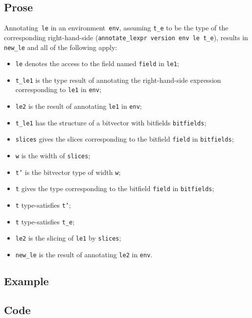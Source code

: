 \documentclass{book}
\begin{document}
    \subsection{Prose}
   Annotating~\texttt{le} in an environment~\texttt{env}, assuming
\texttt{t\_e} to be the type of the corresponding right-hand-side
(\texttt{annotate\_lexpr version env le t\_e}), results in \texttt{new\_le} and
all of the following apply:
   \begin{itemize}
   \item \texttt{le} denotes the access to the field named \texttt{field} in \texttt{le1};
   \item \texttt{t\_le1} is the type result of annotating the right-hand-side expression corresponding to \texttt{le1} in \texttt{env};
   \item \texttt{le2} is the result of annotating \texttt{le1} in \texttt{env};
   \item \texttt{t\_le1} has the structure of a bitvector with bitfields \texttt{bitfields};
   \item \texttt{slices} gives the slices corresponding to the bitfield \texttt{field} in
      \texttt{bitfields};
   \item \texttt{w} is the width of \texttt{slices};
   \item \texttt{t'} is the bitvector type of width \texttt{w};
   \item \texttt{t} gives the type corresponding to the bitfield \texttt{field} in
      \texttt{bitfields};
   \item \texttt{t} type-satisfies \texttt{t'};
   \item \texttt{t} type-satisfies \texttt{t\_e};
   \item \texttt{le2} is the slicing of \texttt{le1} by \texttt{slices};
   \item \texttt{new\_le} is the result of annotating \texttt{le2} in \texttt{env}.
   \end{itemize}

  \subsection{Example}

  \subsection{Code}
\end{document}
